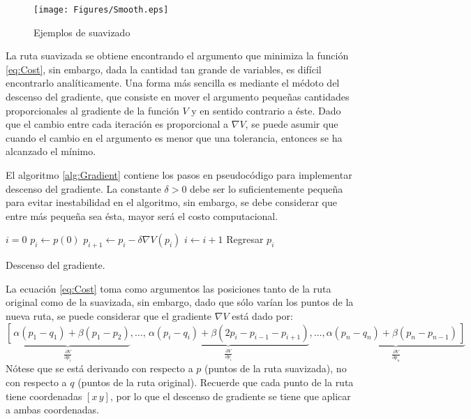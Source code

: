 \documentclass[a4paper]{article}
\newcommand\ddfrac[2]{\frac{\displaystyle #1}{\displaystyle #2}}
\begin{document}
\begin{figure}
\centering
\texttt{[image: Figures/Smooth.eps]}
\caption{Ejemplos de suavizado}
\label{fig:Smooth}
\end{figure}

La ruta suavizada se obtiene encontrando el argumento que minimiza la función \ref{eq:Cost}, sin embargo, dada la cantidad tan grande de variables, es difícil encontrarlo analíticamente. Una forma más sencilla es mediante el médoto del descenso del gradiente, que consiste en mover el argumento pequeñas cantidades proporcionales al gradiente de la función $V$ y en sentido contrario a éste. Dado que el cambio entre cada iteración es proporcional a $\nabla V$, se puede asumir que cuando el cambio en el argumento es menor que una tolerancia, entonces se ha alcanzado el mínimo. 

El algoritmo \ref{alg:Gradient} contiene los pasos en pseudocódigo para implementar descenso del gradiente. La constante $\delta > 0$ debe ser lo suficientemente pequeña para evitar inestabilidad en el algoritmo, sin embargo, se debe considerar que entre más pequeña sea ésta, mayor será el costo computacional. 

\begin{algorithm}
\DontPrintSemicolon
{}
$i = 0$\;
$p_i \leftarrow p(0)$\;
{
\BlankLine
  $p_{i+1} \leftarrow p_i - \delta\nabla V(p_i)$\;
  $i \leftarrow i+1$
\BlankLine
}
Regresar $p_i$
\caption{Descenso del gradiente.}
\label{alg:Gradient}
\end{algorithm}

La ecuación \ref{eq:Cost} toma como argumentos las posiciones tanto de la ruta original como de la suavizada, sin embargo, dado que sólo varían los puntos de la nueva ruta, se puede considerar que el gradiente $\nabla V$ está dado por:
\begin{equation}
\underbrace{\left[\frac{}{}\alpha(p_1 - q_1)+\beta(p_1 - p_2)\right.}_{\ddfrac{\partial V}{\partial p_1}}
,\dots ,
\underbrace{\frac{}{}\alpha(p_i - q_i) + \beta(2p_i - p_{i-1} - p_{i+1})}_{\ddfrac{\partial V}{\partial p_i}}
,\dots ,
\underbrace{\left.\alpha(p_n-q_n)+\beta(p_n - p_{n-1})\frac{}{}\right]}_{\ddfrac{\partial V}{\partial p_n}}
\end{equation}
Nótese que se está derivando con respecto a $p$ (puntos de la ruta suavizada), no con respecto a $q$ (puntos de la ruta original). Recuerde que cada punto de la ruta tiene coordenadas $[x\,y]$, por lo que el descenso de gradiente se tiene que aplicar a ambas coordenadas. 
\end{document}
